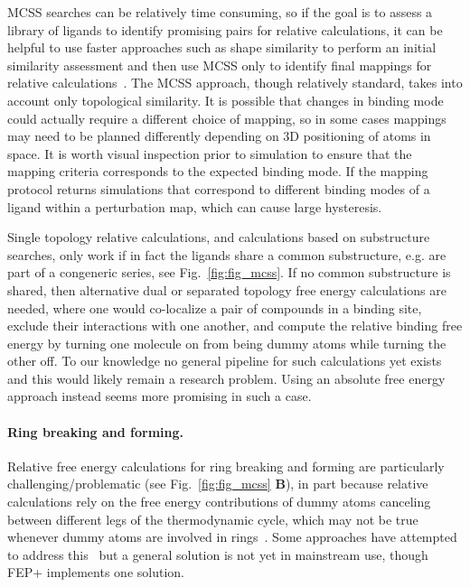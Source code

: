 \documentclass[9pt,bestpractices]{livecoms}
\begin{document}
MCSS searches can be relatively time consuming, so if the goal is to assess a library of ligands to identify promising pairs for relative calculations, it can be helpful to use faster approaches such as shape similarity to perform an initial similarity assessment and then use MCSS only to identify final mappings for relative calculations~\cite{raymond2002maximum,klabunde2012mars,jones2009elucidating}. The MCSS approach, though relatively standard, takes into account only topological similarity. It is possible that changes in binding mode could actually require a different choice of mapping, so in some cases mappings may need to be planned differently depending on 3D positioning of atoms in space. It is worth visual inspection prior to simulation to ensure that the mapping criteria corresponds to the expected binding mode. If the mapping protocol returns simulations that correspond to different binding modes of a ligand within a perturbation map, which can cause large hysteresis.

Single topology relative calculations, and calculations based on substructure searches, only work if in fact the ligands share a common substructure, e.g. are part of a congeneric series, see Fig.~\ref{fig:fig_mcss}.
If no common substructure is shared, then alternative dual or separated topology free energy calculations are needed, where one would co-localize a pair of compounds in a binding site, exclude their interactions with one another, and compute the relative binding free energy by turning one molecule on from being dummy atoms while turning the other off.
To our knowledge no general pipeline for such calculations yet exists and this would likely remain a research problem. Using an absolute free energy approach instead seems more promising in such a case. 

\paragraph{Ring breaking and forming.} Relative free energy calculations for ring breaking and forming are particularly challenging/problematic (see Fig.~\ref{fig:fig_mcss} \textbf{B}), in part because relative calculations rely on the free energy contributions of dummy atoms canceling between different legs of the thermodynamic cycle, which may not be true whenever dummy atoms are involved in rings~\cite{liu2015ring}.
Some approaches have attempted to address this~\cite{clark2019relative} but a general solution is not yet in mainstream use, though FEP+ implements one solution.
\end{document}
